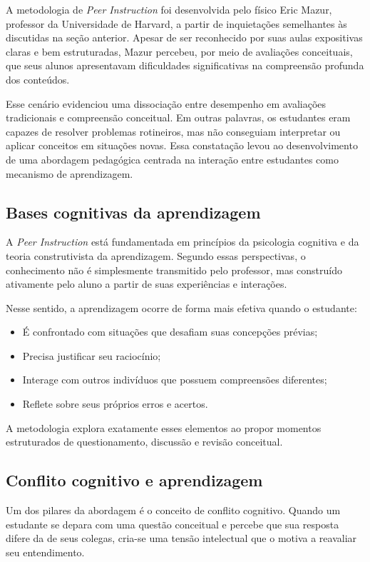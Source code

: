 A metodologia de \textit{Peer Instruction} foi desenvolvida pelo físico Eric Mazur, professor da Universidade de Harvard, a partir de inquietações semelhantes às discutidas na seção anterior. Apesar de ser reconhecido por suas aulas expositivas claras e bem estruturadas, Mazur percebeu, por meio de avaliações conceituais, que seus alunos apresentavam dificuldades significativas na compreensão profunda dos conteúdos.

Esse cenário evidenciou uma dissociação entre desempenho em avaliações tradicionais e compreensão conceitual. Em outras palavras, os estudantes eram capazes de resolver problemas rotineiros, mas não conseguiam interpretar ou aplicar conceitos em situações novas. Essa constatação levou ao desenvolvimento de uma abordagem pedagógica centrada na interação entre estudantes como mecanismo de aprendizagem.

\subsection{Bases cognitivas da aprendizagem}

A {\it Peer Instruction} está fundamentada em princípios da psicologia cognitiva e da teoria construtivista da aprendizagem. Segundo essas perspectivas, o conhecimento não é simplesmente transmitido pelo professor, mas construído ativamente pelo aluno a partir de suas experiências e interações.

Nesse sentido, a aprendizagem ocorre de forma mais efetiva quando o estudante:

\begin{itemize}
    \item É confrontado com situações que desafiam suas concepções prévias;
    \item Precisa justificar seu raciocínio;
    \item Interage com outros indivíduos que possuem compreensões diferentes;
    \item Reflete sobre seus próprios erros e acertos.
\end{itemize}

A metodologia explora exatamente esses elementos ao propor momentos estruturados de questionamento, discussão e revisão conceitual.

\subsection{Conflito cognitivo e aprendizagem}

Um dos pilares da abordagem é o conceito de conflito cognitivo. Quando um estudante se depara com uma questão conceitual e percebe que sua resposta difere da de seus colegas, cria-se uma tensão intelectual que o motiva a reavaliar seu entendimento.


